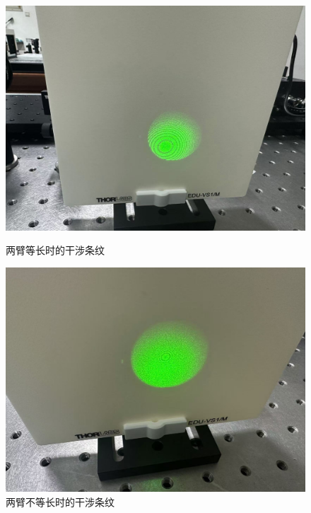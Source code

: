 \documentclass{ctexart}
\begin{document}
\begin{figure}[H]
    \centering
    \begin{minipage}[b]{0.4\textwidth}
      \centering
      \includegraphics[width=\textwidth]{pictures/微信图片_20241212155855.jpg}
      \caption{两臂等长时的干涉条纹}
    \end{minipage}
    \hspace{0.1\textwidth} %
    \begin{minipage}[b]{0.4\textwidth}
      \centering
      \includegraphics[width=\textwidth]{pictures/微信图片_20241212155927.jpg}
      \caption{两臂不等长时的干涉条纹}
    \end{minipage}
  \end{figure}
\end{document}
